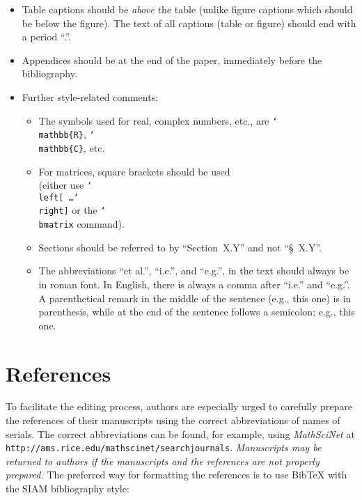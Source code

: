 \documentclass{scrartcl}
\begin{document}
\begin{itemize}
\item Table captions should be \emph{above} the table (unlike figure captions
  which should be below the figure). The text of all captions (table or figure)
  should end with a period ``.''.

\item Appendices should be at the end of the paper, immediately before the
bibliography.

\item Further style-related comments:
\begin{itemize}
\item The symbols used for real, complex numbers, etc.,
are \texttt{{\char`\\mathbb\{R\}}}, \texttt{{\char`\\mathbb\{C\}}}, etc.
%
\item For matrices, square brackets should be used \\
(either use
\texttt{\char`\\left[ \dots \char`\\right]} or the \texttt{\char`\\bmatrix}
command).
%
\item Sections should be referred to by ``Section~X.Y'' and not ``\S~X.Y''.
%
\item The abbreviations ``et al.'', ``i.e.'', and ``e.g.'', in the text
should always be in roman font.
In English, there is always a comma after ``i.e.'' and ``e.g.''.
%
A parenthetical remark in the middle of the sentence (e.g., this one) is in
parenthesis, while at the end of the sentence follows a semicolon; e.g., this
one.
%
\end{itemize}
\end{itemize}


\section{References}
To facilitate the editing process, authors are especially urged to carefully
prepare the references of their manuscripts using the correct abbreviations of
names of serials. The correct abbreviations can be found, for example, using
\emph{MathSciNet} at \texttt{http://ams.rice.edu/mathscinet/searchjournals}.
%
\emph{Manuscripts may be returned to authors if the manuscripts and the
references are not properly prepared.} The preferred way for formatting the
references is to use BibTeX with the SIAM bibliography style:
\end{document}
